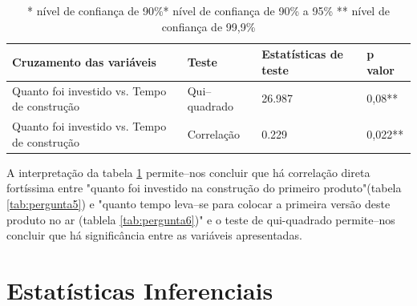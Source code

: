 \begin{table}[hb]
\centering
\caption{Testes de correla\c{c}\~ao e qui--quadrado}
\label{tab:cruza1}
\begin{tabular}{|p{5cm}|p{3cm}|p{3cm}|p{2cm}|}
\hline{\bf Cruzamento das vari\'aveis} & {\bf Teste} & {\bf Estat\'isticas de teste} & {\bf p valor}\\
\hline Quanto foi investido vs. Tempo de constru\c{c}\~ao & Qui--quadrado & 26.987 & 0,08**\\
\hline Quanto foi investido vs. Tempo de constru\c{c}\~ao & Correla\c{c}\~ao & 0.229 & 0,022**\\
\hline
\end{tabular}
\captionsetup{justification=raggedright, singlelinecheck=false}
\caption*{* n\'ivel de confian\c{c}a de 90\%\linebreak ** n\'ivel de confian\c{c}a de 90\% a 95\% \linebreak *** n\'ivel de confian\c{c}a de 99,9\%}
\end{table}

A interpreta\c{c}\~ao da tabela \ref{tab:cruza1} permite--nos concluir que h\'a correla\c{c}\~ao direta fort\'issima entre "quanto foi investido na constru\c{c}\~ao do primeiro produto"(tabela \ref{tab:pergunta5}) e "quanto tempo leva--se para colocar a primeira vers\~ao deste produto no ar (tablela \ref{tab:pergunta6})" e o teste de qui-quadrado permite--nos concluir que h\'a signific\^ancia entre as vari\'aveis apresentadas.

\section{Estat\'isticas Inferenciais}